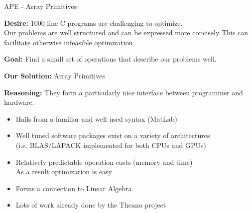 \documentclass[9pt, compress, blue]{beamer}
\begin{document}
\begin{frame}{APE - Array Primitives}

\textbf{Desire:} 1000 line C programs are challenging to optimize. \\
Our problems are well structured and can be expressed more concisely 
This can facilitate otherwise infeasible optimization
\vspace{10pt}

\textbf{Goal:} Find a small set of operations that describe our problems well.
\vspace{10pt}

\textbf{Our Solution:} Array Primitives 
\vspace{10pt}

\textbf{Reasoning:} They form a particularly nice interface between
programmer and hardware. 
\begin{itemize}
\item Hails from a familiar and well used syntax (MatLab)
\item Well tuned software packages exist on a variety of architectures \\
(i.e. BLAS/LAPACK implemented for both CPUs and GPUs) 
\item Relatively predictable operation costs (memory and time) \\
As a result optimization is easy
\item Forms a connection to Linear Algebra
\item Lots of work already done by the Theano project
\end{itemize}

\end{frame}
\end{document}
